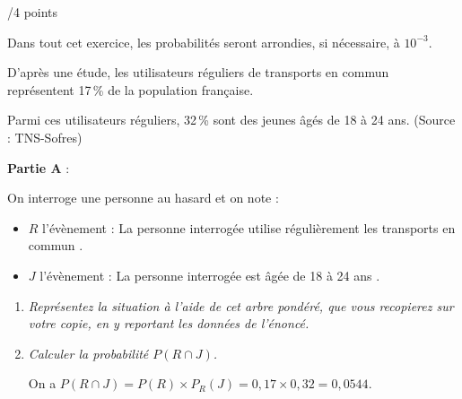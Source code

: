 \documentclass[a4paper]{article}
\begin{document}
\begin{exerciceinterro}{\hspace{2cm}/4 points}{}


Dans tout cet exercice, les probabilités seront arrondies, si nécessaire, à $10^{-3}$.

D'après une étude, les utilisateurs réguliers de transports en commun représentent 17\,\% de la population française. 

Parmi ces utilisateurs réguliers, 32\,\% sont des jeunes âgés de 18 à 24 ans. (Source : TNS-Sofres)

\bigskip

\textbf{Partie A} :

\medskip
 
On interroge une personne au hasard et on note :

\setlength\parindent{9mm}
\begin{itemize}
\item $R$ l'évènement : \og La personne interrogée utilise régulièrement les transports en commun \fg.
\item $J$ l'évènement : \og La personne interrogée est âgée de 18 à 24 ans \fg.
\end{itemize}
\setlength\parindent{0mm}

\medskip

\begin{enumerate}
\item \textit{Représentez la situation à l'aide de cet arbre pondéré, que vous recopierez sur votre copie, en y reportant les données de l'énoncé.}
\begin{center}
		\end{center}

\item \textit{Calculer la probabilité $P(R \cap J)$.}

On a $P(R \cap J)=P(R) \times P_{R}(J)=0,17 \times 0,32=0,0544$.


\end{enumerate}
\end{exerciceinterro}
\end{document}

